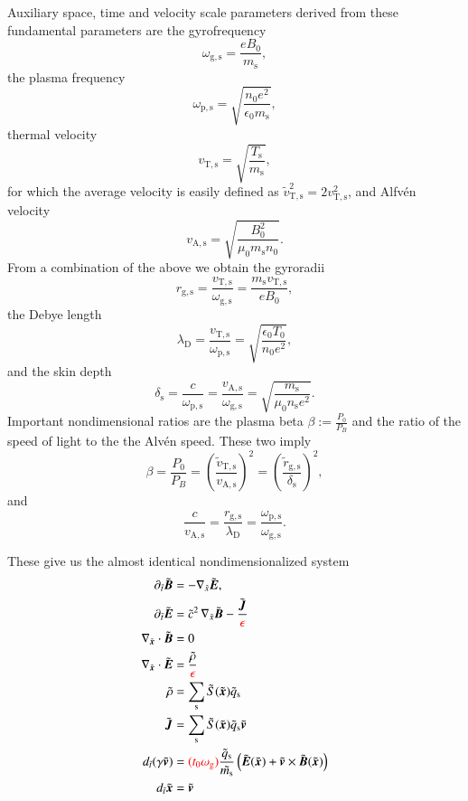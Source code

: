 \documentclass{aa}
\newcommand{\be}{\begin{equation}}
\newcommand{\ee}{\end{equation}}
\newcommand{\red}[1]{\textcolor{red}{#1}}
\renewcommand{\vec}[1]{\ensuremath{\boldsymbol{#1}}}
\begin{document}
Auxiliary space, time and velocity scale parameters derived from these fundamental parameters are the gyrofrequency
\be
\omega_{\mathrm{g,s}} = \frac{e B_0}{m_{\mathrm{s}}},
\ee
the plasma frequency
\be
\omega_{\mathrm{p,s}} = \sqrt{ \frac{n_0 e^2}{\epsilon_0 m_{\mathrm{s}}}},
\ee
thermal velocity
\be
v_{\mathrm{T,s}} = \sqrt{ \frac{T_{\mathrm{s}} }{m_{\mathrm{s}}} },
\ee
for which the average velocity is easily defined as $\tilde{v}_{\mathrm{T,s}}^2 = 2 v_{\mathrm{T,s}}^2$, and 
Alfvén velocity
\be
v_{\mathrm{A, s}} = \sqrt{ \frac{B_0^2}{\mu_0 m_{\mathrm{s}} n_0} }.
\ee
From a combination of the above we obtain the gyroradii
\be
r_{\mathrm{g,s}} = \frac{v_{\mathrm{T,s}} }{ \omega_{\mathrm{g, s}} }  = \frac{ m_{\mathrm{s}} v_{\mathrm{T,s}} }{e B_0},
\ee
the Debye length
\be
\lambda_{\mathrm{D}} = \frac{ v_{\mathrm{T,s}} }{\omega_{\mathrm{p,s}}} = \sqrt{ \frac{ \epsilon_0 T_0 }{n_0 e^2} },
\ee
and the skin depth
\be
\delta_{\mathrm{s}} = \frac{c}{\omega_{\mathrm{p,s}} } = \frac{v_{\mathrm{A,s}} }{\omega_{\mathrm{g,s}}} = \sqrt{ \frac{m_{\mathrm{s}}}{\mu_0 n_{\mathrm{s}} e^2}}.
\ee
Important nondimensional ratios are the plasma beta $\beta := \frac{P_0}{P_B}$ and the ratio of the speed of light to the the Alvén speed.
These two imply
\be
\beta = \frac{P_0}{P_B} = \left( \frac{\tilde{v}_{\mathrm{T,s}} }{v_{\mathrm{A,s}} } \right)^2 = \left( \frac{\tilde{r}_{\mathrm{g,s}} }{\delta_{\mathrm{s}} } \right)^2,
\ee
and
\be
\frac{c}{v_{\mathrm{A,s}}} = \frac{r_{\mathrm{g,s}} }{\lambda_{\mathrm{D}} } = \frac{\omega_{\mathrm{p,s}}}{\omega_{\mathrm{g,s}}}.
\ee


These give us the almost identical nondimensionalized system
\begin{align}\begin{split}
    \partial_{\tilde{t}} \tilde{\vec{B}} &= -\nabla_{\tilde{x}} \tilde{\vec{E}}, \\
    \partial_{\tilde{t}} \tilde{\vec{E}} &=  \tilde{c}^2 \, \nabla_{\tilde{x}} \tilde{\vec{B}} - \frac{\tilde{\vec{J}}}{ \red{\epsilon} } \\ 
    \nabla_{\tilde{\vec{x}}} \cdot \tilde{\vec{B}} &= 0 \\
    \nabla_{\tilde{\vec{x}}} \cdot \tilde{\vec{E}} &= \frac{ \tilde{\rho} }{\red{\epsilon}} \\
    \tilde{\rho} &= \sum_{\mathrm{s}} \tilde{S}(\tilde{\vec{x}}) \tilde{q}_{\mathrm{s}} \\
    \tilde{\vec{J}} &= \sum_{\mathrm{s}} \tilde{S}(\tilde{\vec{x}}) \tilde{q}_{\mathrm{s}} \tilde{\vec{v}} \\
    d_{\tilde{t}}(\gamma \tilde{\vec{v}} ) &= \red{(t_0 \omega_{\mathrm{g}})} \frac{\tilde{q}_{\mathrm{s}}}{\tilde{m_{\mathrm{s}}}} \left( \tilde{\vec{E}}(\tilde{\vec{x}}) + \tilde{\vec{v}} \times \tilde{\vec{B}}(\tilde{\vec{x}}) \right) \\
d_{\tilde{t}} \tilde{\vec{x}} &= \tilde{\vec{v}} \\
\end{split}\end{align}
\end{document}
